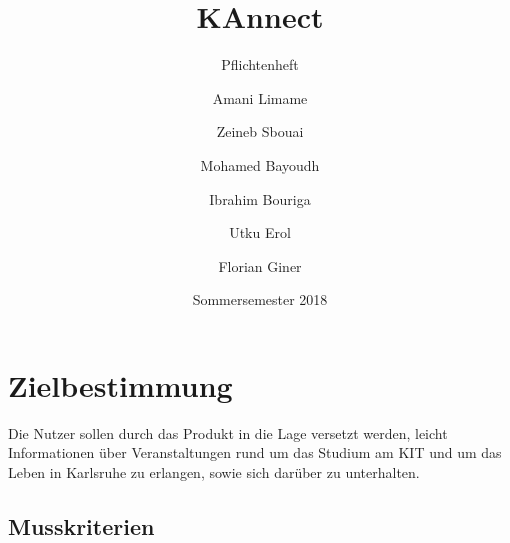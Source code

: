 \documentclass[parskip=full]{scrartcl}
\title{KAnnect}
\subtitle{Pflichtenheft}
\author{
	Amani Limame
	\and Zeineb Sbouai
	\and Mohamed Bayoudh
	\and Ibrahim Bouriga
	\and Utku Erol
	\and Florian Giner
}
\date{Sommersemester 2018}
\begin{document}
		\maketitle
		\newpage
		\tableofcontents
		\newpage
		\setlength{\parindent}{0em}
		\setlength{\parskip}{0.5em}
		
		\section{Zielbestimmung}
		Die Nutzer sollen durch das Produkt in die Lage versetzt werden, leicht Informationen über Veranstaltungen rund um das Studium am
		KIT und um das Leben in Karlsruhe zu erlangen, sowie sich darüber zu unterhalten.
		
		\subsection{Musskriterien}
		
\end{document}
